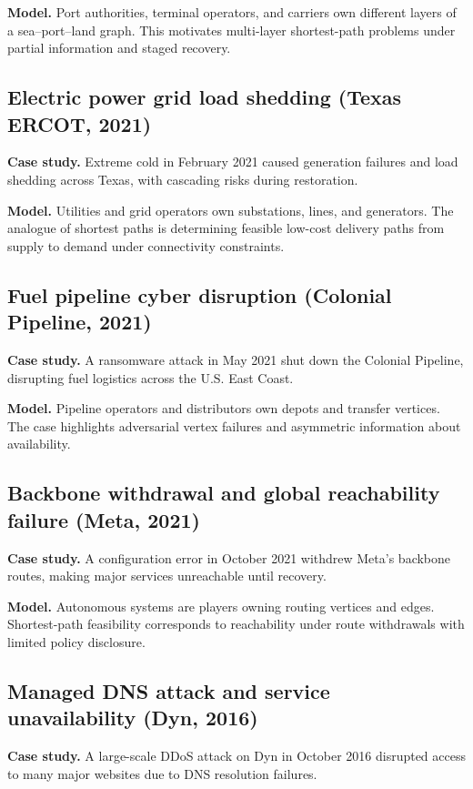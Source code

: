 \documentclass[11pt]{article}
\begin{document}
\textbf{Model.} Port authorities, terminal operators, and carriers own different layers of a sea--port--land graph. This motivates multi-layer shortest-path problems under partial information and staged recovery.

\subsection{Electric power grid load shedding (Texas ERCOT, 2021)}
\textbf{Case study.} Extreme cold in February 2021 caused generation failures and load shedding across Texas, with cascading risks during restoration. \parencite{nerc2021cold,busby2021texas}

\textbf{Model.} Utilities and grid operators own substations, lines, and generators. The analogue of shortest paths is determining feasible low-cost delivery paths from supply to demand under connectivity constraints.

\subsection{Fuel pipeline cyber disruption (Colonial Pipeline, 2021)}
\textbf{Case study.} A ransomware attack in May 2021 shut down the Colonial Pipeline, disrupting fuel logistics across the U.S. East Coast. \parencite{unece2023colonial,reedernhall2021colonial}

\textbf{Model.} Pipeline operators and distributors own depots and transfer vertices. The case highlights adversarial vertex failures and asymmetric information about availability.

\subsection{Backbone withdrawal and global reachability failure (Meta, 2021)}
\textbf{Case study.} A configuration error in October 2021 withdrew Meta's backbone routes, making major services unreachable until recovery. \parencite{meta2021outage,cloudflare2021fb}

\textbf{Model.} Autonomous systems are players owning routing vertices and edges. Shortest-path feasibility corresponds to reachability under route withdrawals with limited policy disclosure.

\subsection{Managed DNS attack and service unavailability (Dyn, 2016)}
\textbf{Case study.} A large-scale DDoS attack on Dyn in October 2016 disrupted access to many major websites due to DNS resolution failures. \parencite{wired2016dyn}
\end{document}
